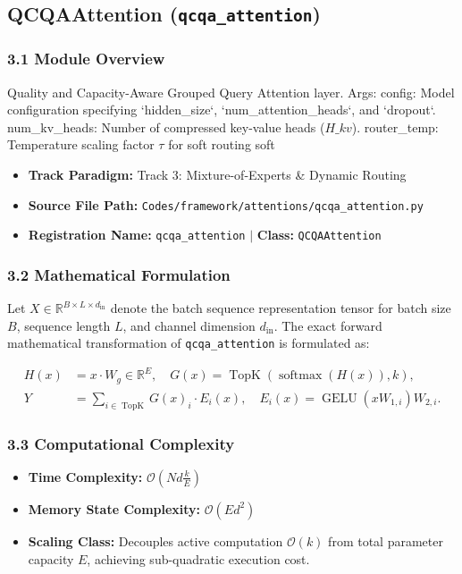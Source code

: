 \subsection{QCQAAttention (\texttt{qcqa\_attention})}
\label{sec:app_module_qcqa\_attention}

\subsubsection*{3.1 Module Overview}
Quality and Capacity-Aware Grouped Query Attention layer.  Args:     config: Model configuration specifying `hidden\_size`, `num\_attention\_heads`, and `dropout`.     num\_kv\_heads: Number of compressed key-value heads ($H\_{kv}$).     router\_temp: Temperature scaling factor $\tau$ for soft routing soft
\begin{itemize}
    \item \textbf{Track Paradigm:} Track 3: Mixture-of-Experts & Dynamic Routing
    \item \textbf{Source File Path:} \texttt{Codes/framework/attentions/qcqa\_attention.py}
    \item \textbf{Registration Name:} \texttt{qcqa\_attention} $\mid$ \textbf{Class:} \texttt{QCQAAttention}
\end{itemize}

\subsubsection*{3.2 Mathematical Formulation}
Let $X \in \mathbb{R}^{B \times L \times d_{\text{in}}}$ denote the batch sequence representation tensor for batch size $B$, sequence length $L$, and channel dimension $d_{\text{in}}$. The exact forward mathematical transformation of \texttt{qcqa\_attention} is formulated as:

\begin{align}
H(x) &= x \cdot W_g \in \mathbb{R}^{E}, \quad G(x) = \operatorname{TopK}\left(\operatorname{softmax}(H(x)), k\right), \\
Y &= \sum_{i \in \operatorname{TopK}} G(x)_i \cdot E_i(x), \quad E_i(x) = \operatorname{GELU}(x W_{1, i}) W_{2, i}.
\end{align}


\subsubsection*{3.3 Computational Complexity}
\begin{itemize}
    \item \textbf{Time Complexity:} $\mathcal{O}(N d \frac{k}{E})$
    \item \textbf{Memory State Complexity:} $\mathcal{O}(E d^2)$
    \item \textbf{Scaling Class:} Decouples active computation $\mathcal{O}(k)$ from total parameter capacity $E$, achieving sub-quadratic execution cost.
\end{itemize}

